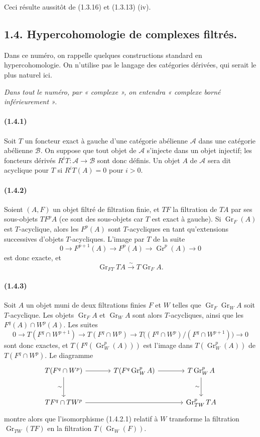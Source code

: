 \documentclass[10pt]{article}
\newcommand{\Gr}{\operatorname{Gr}}
\newcommand{\calA}{\mathcal A}
\newcommand{\calB}{\mathcal B}
\newcommand{\iso}{\xrightarrow{\sim}}
\begin{document}
Ceci résulte aussitôt de (1.3.16) et (1.3.13) (iv).

\subsection*{1.4. Hypercohomologie de complexes filtrés.}

Dans ce numéro, on rappelle quelques constructions standard en hypercohomologie. On n'utilise pas le langage des catégories dérivées, qui serait le plus naturel ici.

\emph{Dans tout le numéro, par « complexe », on entendra « complexe borné inférieurement ».}

\paragraph{(1.4.1)} Soit $T$ un foncteur exact à gauche d'une catégorie abélienne $\calA$ dans une catégorie abélienne $\calB$. On suppose que tout objet de $\calA$ s'injecte dans un objet injectif; les foncteurs dérivés $R^iT:\calA\to\calB$ sont donc définis. Un objet $A$ de $\calA$ sera dit acyclique pour $T$ si $R^iT(A)=0$ pour $i>0$.

\paragraph{(1.4.2)} Soient $(A,F)$ un objet filtré de filtration finie, et $TF$ la filtration de $TA$ par ses sous-objets $TF^pA$ (ce sont des sous-objets car $T$ est exact à gauche). Si $\Gr_F(A)$ est $T$-acyclique, alors les $F^p(A)$ sont $T$-acycliques en tant qu'extensions successives d'objets $T$-acycliques. L'image par $T$ de la suite
\[
0\to F^{p+1}(A)\to F^p(A)\to\Gr^p(A)\to0
\]
est donc exacte, et
\[
\tag{1.4.2.1}
\Gr_{FT}TA\iso T\Gr_FA.
\]

\paragraph{(1.4.3)} Soit $A$ un objet muni de deux filtrations finies $F$ et $W$ telles que $\Gr_F\Gr_WA$ soit $T$-acyclique. Les objets $\Gr_FA$ et $\Gr_WA$ sont alors $T$-acycliques, ainsi que les $F^q(A)\cap W^p(A)$. Les suites
\[
0\to T(F^q\cap W^{p+1})\to T(F^q\cap W^p)\to T\bigl((F^q\cap W^p)/(F^q\cap W^{p+1})\bigr)\to0
\]
sont donc exactes, et $T(F^q(\Gr_W^p(A)))$ est l'image dans $T(\Gr_W^p(A))$ de $T(F^q\cap W^p)$. Le diagramme
\[
\begin{tikzcd}[column sep=large,row sep=large]
T(F^q\cap W^p) \arrow[r] \arrow[d,"\sim"'] & T(F^q\Gr_W^pA) \arrow[r] & T\Gr_W^pA \arrow[d,"\sim"']\\
TF^q\cap TW^p \arrow[rr] && \Gr_{TW}^pTA
\end{tikzcd}
\]
montre alors que l'isomorphisme (1.4.2.1) relatif à $W$ transforme la filtration $\Gr_{TW}(TF)$ en la filtration $T(\Gr_W(F))$.
\end{document}
